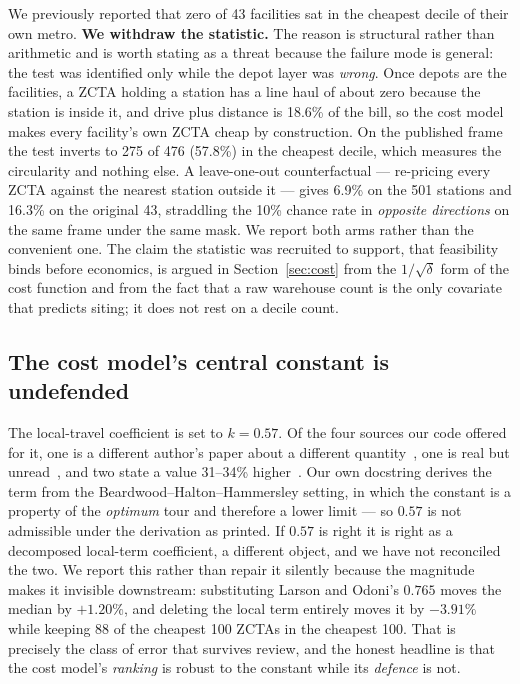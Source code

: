 \documentclass[conference]{IEEEtran}
\begin{document}
We previously reported that zero of 43 facilities sat in the cheapest decile
of their own metro. \textbf{We withdraw the statistic.} The reason is
structural rather than arithmetic and is worth stating as a threat because the
failure mode is general: the test was identified only while the depot layer was
\emph{wrong}. Once depots are the facilities, a ZCTA holding a station has a
line haul of about zero because the station is inside it, and drive plus
distance is 18.6\% of the bill, so the cost model makes every facility's own
ZCTA cheap by construction. On the published frame the test inverts to 275 of
476 (57.8\%) in the cheapest decile, which measures the circularity and nothing
else. A leave-one-out counterfactual --- re-pricing every ZCTA against the
nearest station outside it --- gives 6.9\% on the 501 stations and 16.3\% on
the original 43, straddling the 10\% chance rate in \emph{opposite directions}
on the same frame under the same mask. We report both arms rather than the
convenient one. The claim the statistic was recruited to support, that
feasibility binds before economics, is argued in Section~\ref{sec:cost} from
the $1/\sqrt{\delta}$ form of the cost function and from the fact that a raw
warehouse count is the only covariate that predicts siting; it does not rest
on a decile count.

\subsection{The cost model's central constant is undefended}

The local-travel coefficient is set to $k=0.57$. Of the four sources our code
offered for it, one is a different author's paper about a different
quantity~\cite{vaughan1984}, one is real but unread~\cite{daganzo1984ts}, and
two state a value 31--34\% higher~\cite{bhh1959,larsonodoni1981}. Our own
docstring derives the term from the Beardwood--Halton--Hammersley setting, in
which the constant is a property of the \emph{optimum} tour and therefore a
lower limit --- so $0.57$ is not admissible under the derivation as printed. If
$0.57$ is right it is right as a decomposed local-term coefficient, a different
object, and we have not reconciled the two. We report this rather than repair
it silently because the magnitude makes it invisible downstream: substituting
Larson and Odoni's $0.765$ moves the median by $+1.20\%$, and deleting the
local term entirely moves it by $-3.91\%$ while keeping 88 of the cheapest 100
ZCTAs in the cheapest 100. That is precisely the class of error that survives
review, and the honest headline is that the cost model's \emph{ranking} is
robust to the constant while its \emph{defence} is not.
\end{document}
